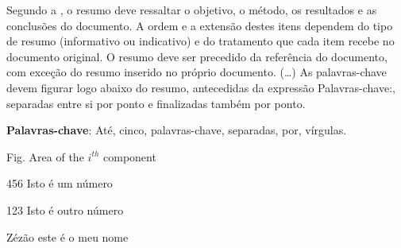\documentclass[12pt, %
openright, 
oneside, %
a4paper,    %
brazil]{facom-ufu-abntex2}
\begin{document}





\begin{resumo} %
  Segundo a , o resumo deve ressaltar o
  objetivo, o método, os resultados e as conclusões do documento. A ordem e a extensão
  destes itens dependem do tipo de resumo (informativo ou indicativo) e do
  tratamento que cada item recebe no documento original. O resumo deve ser
  precedido da referência do documento, com exceção do resumo inserido no
  próprio documento. (\ldots) As palavras-chave devem figurar logo abaixo do
  resumo, antecedidas da expressão Palavras-chave:, separadas entre si por
  ponto e finalizadas também por ponto.

  \vspace{\onelineskip}

  \noindent
  \textbf{Palavras-chave}: Até, cinco, palavras-chave, separadas, por, vírgulas. %
\end{resumo}

\listoffigures*
\cleardoublepage

\listoftables*
\cleardoublepage



\begin{siglas} %
  \item[Fig.] Area of the $i^{th}$ component
  \item[456] Isto é um número
  \item[123] Isto é outro número
  \item[Zézão] este é o meu nome
\end{siglas}
\end{document}
